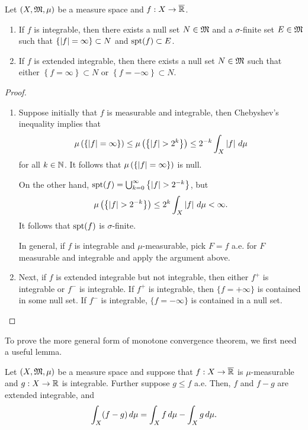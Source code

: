 \documentclass[a4paper]{article}
\renewcommand{\cupinfk}{\bigcup_{k=0}^\infty}
\begin{document}
\begin{cor}
Let $(X, \mathfrak{M}, \mu)$ be a measure space and $f: X \to \overline{\mathbb{R}}$.
\begin{enumerate}
  \item If $f$ is integrable, then there exists
  a null set $N \in \mathfrak{M}$ and a $\sigma$-finite set $E \in \mathfrak{M}$
  such that
  $\left\{ \left\lvert f\right\rvert = \infty \right\} \subset N$
  and $\operatorname{spt}(f) \subset E$.

  \item If $f$ is extended integrable, then there
  exists a null set $N \in \mathfrak{M}$ such that
  either $\left\{ f = \infty \right\} \subset N$
  or $\left\{ f = -\infty \right\} \subset N$.
\end{enumerate}
\end{cor}

\begin{proof}
\begin{enumerate}
  \item Suppose initially that $f$ is measurable and integrable,
  then Chebyshev's inequality implies that
  \[
  \mu \left( \left\{ \left\lvert f\right\rvert = \infty \right\} \right)
  \leq \mu \left( \left\{ \left\lvert f\right\rvert > 2^k \right\} \right)
  \leq 2^{-k} \int_X \left\lvert f\right\rvert \, d \mu
  \]
  for all $k \in \mathbb{N}$. It follows that
  $\mu \left( \left\{ \left\lvert f\right\rvert = \infty \right\} \right)$
  is null.

  On the other hand, $\spt(f) = \cupinfk \left\{ \abs{f}
  > 2^{-k} \right\}$, but
  \[
  \mu \left( \left\{ \left\lvert f\right\rvert > 2^{-k} \right\} \right)
  \leq 2^k \int_X \left\lvert f\right\rvert \, d \mu < \infty.
  \]
  It follows that $\operatorname{spt}(f)$ is $\sigma$-finite.

  In general, if $f$ is integrable and $\mu$-measurable,
  pick $F = f$ a.e. for $F$ measurable and integrable and
  apply the argument above.

  \item Next, if $f$ is extended integrable but not integrable,
  then either $f^+$ is integrable or $f^-$ is integrable.
  If $f^+$ is integrable, then $\{f = +\infty\}$ is
  contained in some null set. If $f^-$ is integrable,
  $\{f = -\infty\}$ is contained in a null set.
\end{enumerate}
\end{proof}

To prove the more general form of monotone convergence theorem,
we first need a useful lemma.

\begin{lemma}
Let $(X, \mathfrak{M}, \mu)$ be a measure space and suppose that
$f : X \to \overline{\mathbb{R}}$ is $\mu$-measurable and $g : X \to \mathbb{R}$
is integrable. Further suppose $g \leq f$ a.e. Then, $f$
and $f - g$ are extended integrable, and
\[
\int_X (f - g) \, d \mu = \int_X f \, d \mu - \int_X g \, d \mu.
\]
\end{lemma}
\end{document}
